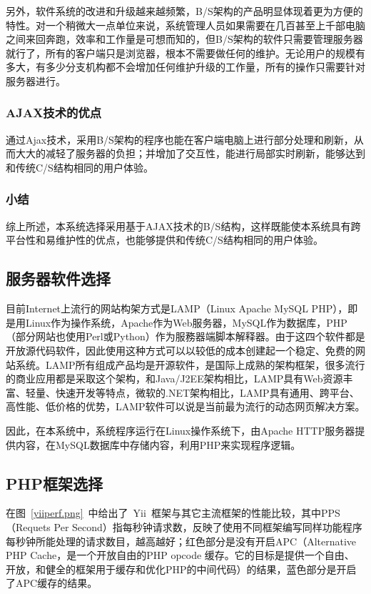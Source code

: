 另外，软件系统的改进和升级越来越频繁，B/S架构的产品明显体现着更为方便的特性。对一个稍微大一点单位来说，系统管理人员如果需要在几百甚至上千部电脑之间来回奔跑，效率和工作量是可想而知的，但B/S架构的软件只需要管理服务器就行了，所有的客户端只是浏览器，根本不需要做任何的维护。无论用户的规模有多大，有多少分支机构都不会增加任何维护升级的工作量，所有的操作只需要针对服务器进行。

\subsubsection{AJAX技术的优点}

通过Ajax技术，采用B/S架构的程序也能在客户端电脑上进行部分处理和刷新，从而大大的减轻了服务器的负担；并增加了交互性，能进行局部实时刷新，能够达到和传统C/S结构相同的用户体验。

\subsubsection{小结}

综上所述，本系统选择采用基于AJAX技术的B/S结构，这样既能使本系统具有跨平台性和易维护性的优点，也能够提供和传统C/S结构相同的用户体验。

\subsection{服务器软件选择}

目前Internet上流行的网站构架方式是LAMP（Linux Apache MySQL PHP），即是用Linux作为操作系统，Apache作为Web服务器，MySQL作为数据库，PHP（部分网站也使用Perl或Python）作为服務器端脚本解释器。由于这四个软件都是开放源代码软件，因此使用这种方式可以以较低的成本创建起一个稳定、免费的网站系统。LAMP所有组成产品均是开源软件，是国际上成熟的架构框架，很多流行的商业应用都是采取这个架构，和Java/J2EE架构相比，LAMP具有Web资源丰富、轻量、快速开发等特点，微软的.NET架构相比，LAMP具有通用、跨平台、高性能、低价格的优势，LAMP软件可以说是当前最为流行的动态网页解决方案。

因此，在本系统中，系统程序运行在Linux操作系统下，由Apache HTTP服务器提供内容，在MySQL数据库中存储内容，利用PHP来实现程序逻辑。

\subsection{PHP框架选择}

在图~\ref{yiiperf.png}~中给出了~Yii~框架与其它主流框架的性能比较，其中PPS（Requets Per Second）指每秒钟请求数，反映了使用不同框架编写同样功能程序每秒钟所能处理的请求数目，越高越好；红色部分是没有开启APC（Alternative PHP Cache，是一个开放自由的PHP opcode 缓存。它的目标是提供一个自由、 开放，和健全的框架用于缓存和优化PHP的中间代码）的结果，蓝色部分是开启了APC缓存的结果。

